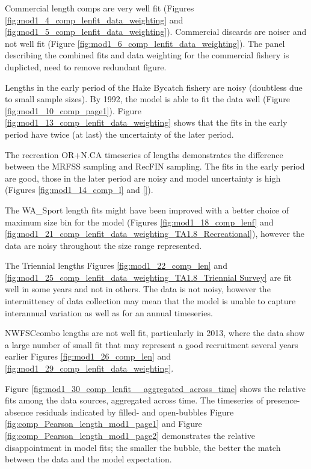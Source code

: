 \documentclass[12pt,]{article}
\begin{document}
Commercial length comps are very well fit (Figures
\ref{fig:mod1_4_comp_lenfit_data_weighting} and
\ref{fig:mod1_5_comp_lenfit_data_weighting}). Commercial discards are
noiser and not well fit (Figure
\ref{fig:mod1_6_comp_lenfit_data_weighting}). The panel describing the
combined fits and data weighting for the commercial fishery is
duplicted, need to remove redundant figure.

Lengths in the early period of the Hake Bycatch fishery are noisy
(doubtless due to small sample sizes). By 1992, the model is able to fit
the data well (Figure \ref{fig:mod1_10_comp_page1}). Figure
\ref{fig:mod1_13_comp_lenfit_data_weighting} shows that the fits in the
early period have twice (at last) the uncertainty of the later period.

The recreation OR+N.CA timeseries of lengths demonstrates the difference
between the MRFSS sampling and RecFIN sampling. The fits in the early
period are good, those in the later period are noisy and model
uncertainty is high (Figures \ref{fig:mod1_14_comp_l} and \ref{}).

The WA\_Sport length fits might have been improved with a better choice
of maximum size bin for the model (Figures \ref{fig:mod1_18_comp_lenf}
and \ref{fig:mod1_21_comp_lenfit_data_weighting_TA1.8_Recreational}),
however the data are noisy throughout the size range represented.

The Triennial lengths Figures \ref{fig:mod1_22_comp_len} and
\ref{fig:mod1_25_comp_lenfit_data_weighting_TA1.8_Triennial Survey} are
fit well in some years and not in others. The data is not noisy, however
the intermittency of data collection may mean that the model is unable
to capture interannual variation as well as for an annual timeseries.

NWFSCcombo lengths are not well fit, particularly in 2013, where the
data show a large number of small fit that may represent a good
recruitment several years earlier Figures \ref{fig:mod1_26_comp_len} and
\ref{fig:mod1_29_comp_lenfit_data_weighting}.

Figure \ref{fig:mod1_30_comp_lenfit__aggregated_across_time} shows the
relative fits among the data sources, aggregated across time. The
timeseries of presence-absence residuals indicated by filled- and
open-bubbles Figure \ref{fig:comp_Pearson_length_mod1_page1} and Figure
\ref{fig:comp_Pearson_length_mod1_page2} demonstrates the relative
disappointment in model fits; the smaller the bubble, the better the
match between the data and the model expectation.
\end{document}
